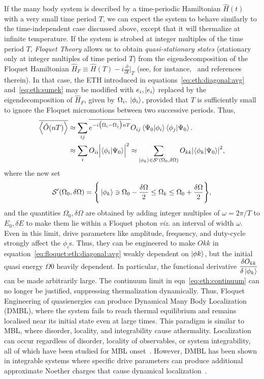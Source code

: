 \documentclass[%
reprint,
superscriptaddress,
amsmath,amssymb,
aps,
prb,
]{revtex4-2}
\begin{document}
If the many body system is described by a time-periodic Hamiltonian $\hat H(t)$ with a very small time period $T$, we can expect the system to behave similarly to the time-independent case discussed above, except that it will thermalize at infinite temperature. If the system is strobed at integer multiples of the time period $T$, \emph{Floquet Theory} allows us to obtain \textit{quasi-stationary states} (stationary only at integer multiples of time period $T$) from the eigendecomposition of the Floquet Hamiltonian $\hat{H}_F\equiv \hat{H}(T) - i \frac{\partial}{\partial t}\vert_T$ (see, for instance,~\cite{reichl_transition_2021, bukov2014} and references therein). In that case, the ETH introduced in equations~\ref{eq:eth:diagonal:avg} and~\ref{eq:eth:sumek} may be modified with $e_i, \ket{e_i}$ replaced by the eigendecomposition of $\hat{H}_F$, given by $\Omega_i,\; \ket{\phi_i}$, provided that $T$ is sufficiently small to ignore the Floquet micromotions between two successive periods. Thus,
	\begin{align}
		\overline{\ev{\hat{O}(nT)}} &\approx \sum_{ij}\overline{e^{-i\big(\Omega_i-\Omega_j\big)nT}}O_{ij} \ip{\Psi_0}{\phi_i}\ip{\phi_j}{\Psi_0}.\nonumber\\
		&\approx\sum_i O_{ii} \abs\Big{ \ip{\phi_i}{\Psi_0}}^2\approx \sum_{\ket{\phi_k}\in \mathcal{S}^\prime(\Omega_0, \delta \Omega)}O_{kk}\abs{\ip{\phi_k}{\Psi_0}}^2,
		\label{eq:floquet:eth:diagonal:avg}
	\end{align}
	where the new set
	\begin{equation}
	\mathcal{S}^\prime(\Omega_0, \delta \Omega) = \Bigg\{\ket{\phi_k}\ni \Omega_0-\frac{\delta \Omega}{2}\leq \Omega_k \leq \Omega_0+\frac{\delta \Omega}{2}\Bigg\},\nonumber
	\end{equation}
	and the quantities $\Omega_0, \delta\Omega$ are obtained by adding integer multiples of $\omega=2\pi/T$ to $E_0, \delta E$ to make them lie within a Floquet photon \textit{viz.} an interval of width $\omega$.
	Even in this limit, drive parameters like amplitude, frequency, and duty-cycle strongly affect the $\phi_i$s. Thus, they can be engineered to make $O {kk}$ in equation~\ref{eq:floquet:eth:diagonal:avg} weakly dependent on $\ket{\phi k}$, but the initial quasi energy $\Omega 0$ heavily dependent. In particular,  the functional derivative $\displaystyle\frac{\var{O_{kk}}}{\var{\ket{\phi_k}}}$ can be made arbitrarily large.  The continuum limit in eqn~\ref{eq:eth:continuum} can no longer be justified, suppressing thermalization dynamically. Thus, Floquet Engineering of quasienergies can produce Dynamical Many Body Localization (DMBL), where the system fails to reach thermal equilibrium and remains localised near its initial state even at large times. This paradigm is similar to MBL, where disorder, locality, and integrability cause athermality. Localization can occur regardless of disorder, locality of observables, or system integrability, all of which have been studied for MBL onset~\cite{Sougata2023,Fabien2018,garratt_resonant_2022}. However, DMBL has been shown in integrable systems where specific drive parameters can produce additional approximate Noether charges that cause dynamical localization~\cite{roy_fate_2015}.
	
\end{document}
